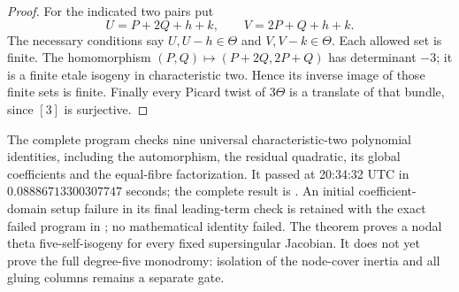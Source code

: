 \begin{proof}
For the indicated two pairs put
\[
             U=P+2Q+h+k,\qquad V=2P+Q+h+k.
\]
The necessary conditions say
$U,U-h\in\Theta$ and $V,V-k\in\Theta$.
Each allowed set is finite. The homomorphism
$(P,Q)\mapsto(P+2Q,2P+Q)$ has determinant $-3$; it is a finite
etale isogeny in characteristic two. Hence its inverse image of
those finite sets is finite. Finally every Picard twist of
$3\Theta$ is a translate of that bundle, since $[3]$ is surjective.
\end{proof}

\begin{remark}
\label{rem:uniform-five-theta-geometry-scope-candidate}
The complete program
checks nine universal characteristic-two polynomial identities,
including the automorphism, the residual quadratic, its global
coefficients and the equal-fibre factorization. It passed at
20:34:32 UTC in $0.08886713300307747$ seconds; the complete result is
.
An initial coefficient-domain setup failure in its final leading-term
check is retained with the exact failed program in ;
no mathematical identity failed. The theorem proves a nodal theta
five-self-isogeny for every fixed supersingular Jacobian. It does
not yet prove the full degree-five monodromy: isolation of the
node-cover inertia and all gluing columns remains a separate gate.
\end{remark}

